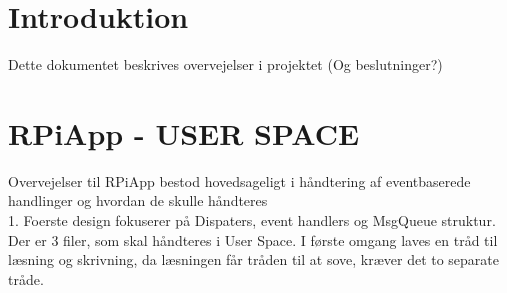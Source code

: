 \documentclass{article}
\begin{document}
\section{Introduktion}
Dette dokumentet beskrives overvejelser i projektet (Og beslutninger?)

\section{RPiApp - USER SPACE}
Overvejelser til RPiApp bestod hovedsageligt i håndtering af eventbaserede handlinger og hvordan de skulle håndteres
\\1. Foerste design fokuserer på Dispaters, event handlers og MsgQueue struktur. Der er 3 filer, som skal håndteres i User Space. I første omgang laves en tråd til læsning og skrivning, da læsningen får tråden til at sove, kræver det to separate tråde.  
\end{document}
